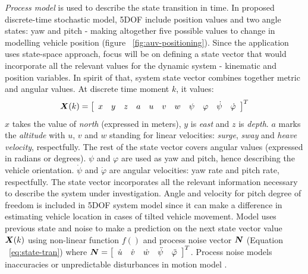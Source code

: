 \textit{Process model} is used to describe the state transition in time. In proposed discrete-time stochastic model, 5DOF include position values and two angle states: yaw and pitch - making altogether five possible values to change in modelling vehicle position (figure ~\ref{fig:auv-positioning}). Since the application uses state-space approach, focus will be on defining a state vector that would incorporate all the relevant values for the dynamic system - kinematic and position variables. In spirit of that, system state vector combines together metric and angular values. At discrete time moment $k$, it values:
$$ \boldsymbol{X}(k) = 
\left[ 
\begin{array}{ccccccccccc}
x & y & z & a & u & v & w & \psi & \varphi & \dot{\psi} & \dot{\varphi}
\end{array}
\right] ^{T} $$  
$x$ takes the value of \textit{north} (expressed in meters), $y$ is \textit{east} and $z$ is \textit{depth}. $a$ marks the \textit{altitude} with $u$, $v$ and $w$ standing for linear velocities: \textit{surge}, \textit{sway} and \textit{heave velocity}, respectfully. The rest of the state vector covers angular values (expressed in radians or degrees). $\psi$ and $\varphi$ are used as yaw and pitch, hence describing the vehicle orientation. $\dot{\psi}$ and $\dot{\varphi}$ are angular velocities: yaw rate and pitch rate, respectfully. The state vector incorporates all the relevant information necessary to describe the system under investigation. Angle and velocity for pitch degree of freedom is included in 5DOF system model since it can make a difference in estimating vehicle location in cases of tilted vehicle movement. Model uses previous state and noise to make a prediction on the next state vector value $\boldsymbol{X}(k)$  using non-linear function $f()$ and process noise vector $\boldsymbol{N}$ (Equation ~\ref{eq:state-tran}) where $\boldsymbol{N} = \left[ \begin{array}{ccccc} \dot{u} & \dot{v} & \dot{w} & \ddot{\psi} & \ddot{\varphi} \end{array} \right]^{T}$. Process noise models inaccuracies or unpredictable disturbances in motion model \cite{ristic04}. 
